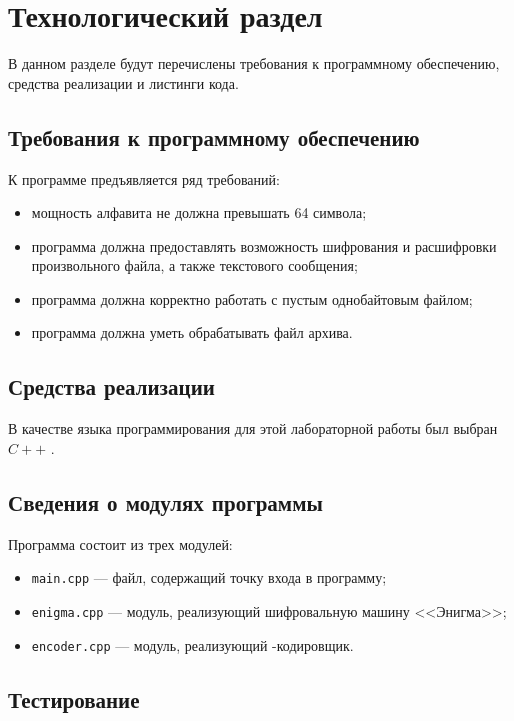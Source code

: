 \chapter{Технологический раздел}

В данном разделе будут перечислены требования к программному обеспечению, средства реализации и листинги кода.

\section{Требования к программному обеспечению}

К программе предъявляется ряд требований:

\begin{itemize} [label=--]
	\item мощность алфавита не должна превышать 64 символа;
	\item программа должна предоставлять возможность шифрования и расшифровки произвольного файла, а также текстового сообщения;
	\item программа должна корректно работать с пустым однобайтовым файлом;
	\item программа должна уметь обрабатывать файл архива.
\end{itemize}

\section{Средства реализации}

В качестве языка программирования для этой лабораторной работы был выбран $C++$ \cite{pl}.

\section{Сведения о модулях программы}

Программа состоит из трех модулей: 

\begin{itemize}
	\item \texttt{main.cpp} --- файл, содержащий точку входа в программу;
	\item \texttt{enigma.cpp} --- модуль, реализующий шифровальную машину <<Энигма>>;
	\item \texttt{encoder.cpp} --- модуль, реализующий -кодировщик.
\end{itemize}

\section{Тестирование}

